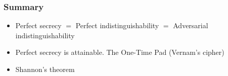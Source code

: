 \begin{frame}\frametitle{Summary}
\begin{itemize}
\item Perfect secrecy $=$ Perfect indistinguishability $=$ Adversarial indistinguishability
\item Perfect secrecy is attainable. The One-Time Pad (Vernam's cipher)
\item Shannon's theorem
\end{itemize}	
\end{frame}

